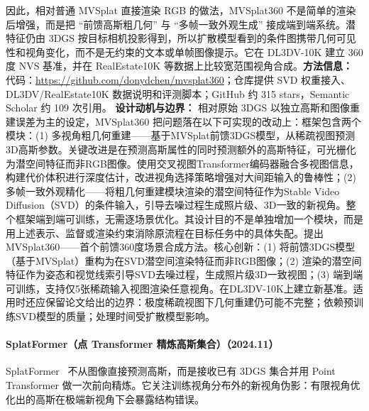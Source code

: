 因此，相对普通 MVSplat 直接渲染 RGB 的做法，MVSplat360 不是简单的渲染后增强，而是把 ``前馈高斯粗几何'' 与 ``多帧一致外观生成'' 接成端到端系统。潜特征仍由 3DGS 按目标相机投影得到，所以扩散模型看到的条件图携带几何可见性和视角变化，而不是无约束的文本或单帧图像提示。它在 DL3DV-10K 建立 360 度 NVS 基准，并在 RealEstate10K 等数据上比较宽范围视角合成。\textbf{方法信息：} 代码：\url{https://github.com/donydchen/mvsplat360}；仓库提供 SVD 权重接入、DL3DV/RealEstate10K 数据说明和评测脚本；GitHub 约 315 stars，Semantic Scholar 约 109 次引用。
\textbf{设计动机与边界：} 相对原始 3DGS 以独立高斯和图像重建误差为主的设定，MVSplat360 把问题落在以下可实现的改动上：框架包含两个模块：(1) 多视角粗几何重建——基于MVSplat前馈3DGS模型，从稀疏视图预测3D高斯参数。关键改进是在预测高斯属性的同时预测额外的高斯特征，可光栅化为潜空间特征而非RGB图像。使用交叉视图Transformer编码器融合多视图信息，构建代价体积进行深度估计，改进视角选择策略增强对大间距输入的鲁棒性；(2) 多帧一致外观精化——将粗几何重建模块渲染的潜空间特征作为Stable Video Diffusion（SVD）的条件输入，引导去噪过程生成照片级、3D一致的新视角。整个框架端到端可训练，无需逐场景优化。其设计目的不是单独增加一个模块，而是用上述表示、监督或渲染约束消除原流程在目标任务中的具体失配。提出MVSplat360——首个前馈360度场景合成方法。核心创新：(1) 将前馈3DGS模型（基于MVSplat）重构为在SVD潜空间渲染特征而非RGB图像；(2) 渲染的潜空间特征作为姿态和视觉线索引导SVD去噪过程，生成照片级3D一致视图；(3) 端到端可训练，支持仅5张稀疏输入视图渲染任意视角。在DL3DV-10K上建立新基准。适用时还应保留论文给出的边界：极度稀疏视图下几何重建仍可能不完整；依赖预训练SVD模型的质量；处理时间受扩散模型影响。
\paragraph{SplatFormer（点 Transformer 精炼高斯集合）（2024.11）}
SplatFormer~\cite{2411_06390} 不从图像直接预测高斯，而是接收已有 3DGS 集合并用 Point Transformer 做一次前向精炼。它关注训练视角分布外的新视角伪影：有限视角优化出的高斯在极端新视角下会暴露结构错误。

